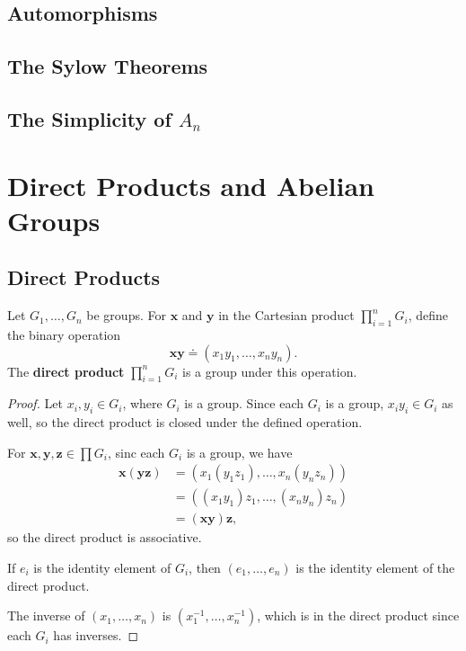 \documentclass[10pt]{report}
\begin{document}
\section{Automorphisms}



\section{The Sylow Theorems}



\section{The Simplicity of \texorpdfstring{$A_n$}{the Alternating Group}}




\chapter{Direct Products and Abelian Groups}



\section{Direct Products}

\begin{thrm}{}{}
Let $G_1, \dots, G_n$ be groups. For $\mathbf{x}$ and $\mathbf{y}$ in the Cartesian product $\prod_{i=1}^n G_i$, define the binary operation
\[
	\mathbf{x}\mathbf{y} \doteq (x_1y_1, \dots, x_n y_n).
\] The \textbf{direct product} $\prod_{i=1}^n G_i$ is a group under this operation.
\end{thrm}
\begin{proof}
	Let $x_i, y_i \in G_i$, where $G_i$ is a group. Since each $G_i$ is a group, $x_i y_i \in G_i$ as well, so the direct product is closed under the defined operation.

	For $\mathbf{x},\mathbf{y},\mathbf{z} \in \prod G_i$, sinc each $G_i$ is a group, we have
	\begin{align*}
		\mathbf{x}(\mathbf{y}\mathbf{z}) &= (x_1(y_1z_1), \dots, x_n(y_n z_n)) \\
						 &= ( (x_1y_1)z_1, \dots, (x_n y_n)z_n) \\
						 &= (\mathbf{x}\mathbf{y})\mathbf{z},
	\end{align*}
	so the direct product is associative.

	If $e_i$ is the identity element of $G_i$, then $(e_1, \dots, e_n)$ is the identity element of the direct product.

	The inverse of $(x_1, \dots, x_n)$ is $(x_1^{-1}, \dots, x_n^{-1})$, which is in the direct product since each $G_i$ has inverses.
\end{proof}
\end{document}
